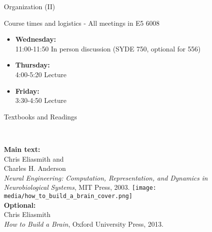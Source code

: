 \documentclass[aspectratio=169]{beamer}
\begin{document}
\begin{frame}{Organization (II)}
	\begin{block}{Course times and logistics - All meetings in E5 6008}
		\begin{itemize}
			\item \textbf{Wednesday:}\\
			11:00-11:50 In person discussion (SYDE 750, optional for 556)
			\item \textbf{Thursday:}\\
      4:00-5:20 Lecture
			\item \textbf{Friday:}\\
			3:30-4:50 Lecture 
		\end{itemize}
	\end{block}

\end{frame}

\begin{frame}{Textbooks and Readings}
	\begin{columns}[T]
			\raggedleft
			\fboxrule=0.4pt\fboxsep=0pt\\
			\small
			\textbf{Main text:}\\
			Chris Eliasmith and\\Charles H. Anderson\\
			\emph{Neural Engineering: Computation, Representation, and Dynamics in Neurobiological Systems}, MIT Press, 2003.
			\raggedleft
			\texttt{[image: media/how\_to\_build\_a\_brain\_cover.png]}\\
			\small
			\textbf{Optional:}\\
			Chris Eliasmith\\
			\emph{How to Build a Brain}, Oxford University Press, 2013.
	\end{columns}
\end{frame}
\end{document}
